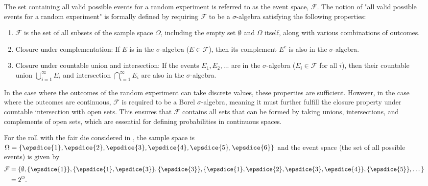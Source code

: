 \begin{definition}
	The set containing all valid possible events for a random experiment is referred to as the event space, $\mathcal{F}$. The notion of "all valid possible events for a random experiment" is formally defined by requiring $\mathcal{F}$ to be a $\sigma$-algebra satisfying the following properties:
	\begin{enumerate}
		\item $\mathcal{F}$ is the set of all subsets of the sample space $\Omega$, including the empty set $\emptyset$ and $\Omega$ itself, along with various combinations of outcomes.
		\item Closure under complementation: If $E$ is in the $\sigma$-algebra ($E \in \mathcal{F}$), then its complement $E^c$ is also in the $\sigma$-algebra.
		\item Closure under countable union and intersection: If the events $E_1, E_2, \dots$ are in the $\sigma$-algebra ($E_i \in \mathcal{F}$ for all $i$), then their countable union $\bigcup_{i=1}^{\infty} E_i$ and intersection $\bigcap_{i=1}^{\infty} E_i$ are also in the $\sigma$-algebra.
	\end{enumerate}
	In the case where the outcomes of the random experiment can take discrete values, these properties are sufficient. However, in the case where the outcomes are continuous, $\mathcal{F}$ is required to be a Borel $\sigma$-algebra, meaning it must further fulfill the closure property under countable intersection with open sets. This ensures that $\mathcal{F}$ contains all sets that can be formed by taking unions, intersections, and complements of open sets, which are essential for defining probabilities in continuous spaces.
\end{definition}


\begin{example}
	\label{ex:die2}
	For the roll with the fair die considered in , the sample space is $\Omega = \{ \epsdice{1}, \epsdice{2}, \epsdice{3}, \epsdice{4}, \epsdice{5}, \epsdice{6} \}$ and the event space (the set of all possible events) is given by
	\begin{equation}
		\begin{split}
			\mathcal{F}&=\{\emptyset, \{\epsdice{1}\},\{\epsdice{1},\epsdice{3}\},\{\epsdice{3}\},\{\epsdice{1},\epsdice{2},\epsdice{3},\epsdice{4}\},\{\epsdice{5}\},\dots\}\\
			& = 2^\Omega.
		\end{split}
	\end{equation}
\end{example}

